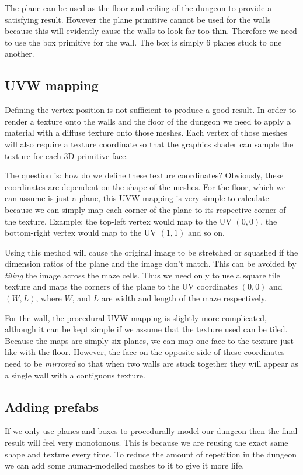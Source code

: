 The plane can be used as the floor and ceiling of the dungeon to provide a satisfying result. However the plane primitive cannot be used for the walls because this will evidently cause the walls to look far too thin. Therefore we need to use the box primitive for the wall. The box is simply 6 planes stuck to one another.

\subsection{UVW mapping}
Defining the vertex position is not sufficient to produce a good result. In order to render a texture onto the walls and the floor of the dungeon we need to apply a material with a diffuse texture onto those meshes. Each vertex of those meshes will also require a texture coordinate so that the graphics shader can sample the texture for each 3D primitive face.

The question is: how do we define these texture coordinates? Obviously, these coordinates are dependent on the shape of the meshes. For the floor, which we can assume is just a plane, this UVW mapping is very simple to calculate because we can simply map each corner of the plane to its respective corner of the texture. Example: the top-left vertex would map to the UV $(0,0)$, the bottom-right vertex would map to the UV $(1,1)$ and so on.

Using this method will cause the original image to be stretched or squashed if the dimension ratios of the plane and the image don't match. This can be avoided by {\em tiling} the image across the maze cells. Thus we need only to use a square tile texture and maps the corners of the plane to the UV coordinates $(0,0)$ and $(W,L)$, where $W$, and $L$ are width and length of the maze respectively.

For the wall, the procedural UVW mapping is slightly more complicated, although it can be kept simple if we assume that the texture used can be tiled. Because the maps are simply six planes, we can map one face to the texture just like with the floor. However, the face on the opposite side of these coordinates need to be {\em mirrored} so that when two walls are stuck together they will appear as a single wall with a contiguous texture.

\subsection{Adding prefabs}
If we only use planes and boxes to procedurally model our dungeon then the final result will feel very monotonous. This is because we are reusing the exact same shape and texture every time. To reduce the amount of repetition in the dungeon we can add some human-modelled meshes to it to give it more life.

